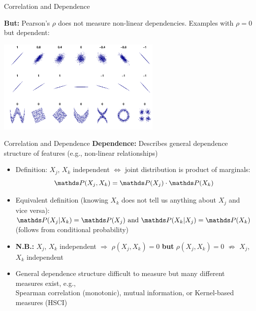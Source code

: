 \documentclass[11pt,compress,t,notes=noshow, aspectratio=169, xcolor=table]{beamer}
\begin{document}
\begin{frame}{Correlation and Dependence}

\textbf{But:} Pearson's $\rho$ does not measure non-linear dependencies. Examples with $\rho = 0$ but dependent:

\centering
\includegraphics[width = 0.6\textwidth, trim=0 0 0 190px, clip]{figure/dependence_2}
\end{frame}



\begin{frame}{Correlation and Dependence}
\textbf{Dependence:} Describes general dependence structure of features (e.g., non-linear relationships)

\begin{itemize}
\item Definition: $X_j$, $X_k$ independent $\Leftrightarrow$ joint distribution is product of marginals:
$$\P(X_j, X_k) = \P(X_j) \cdot \P(X_k)$$
\item Equivalent definition (knowing $X_k$ does not tell us anything about $X_j$ and vice versa): \\
\medskip
\phantom{AAA} $\P(X_j|X_k) = \P(X_j) \text{ and } \P(X_k|X_j) = \P(X_k)$ \hfill (follows from conditional probability) \phantom{AAA}
\medskip
\item \textbf{N.B.:} $X_j$, $X_k$ independent $\Rightarrow$ $\rho(X_j, X_k) = 0$ \textbf{but} $\rho(X_j, X_k) = 0$ $\nRightarrow$ $X_j$, $X_k$  independent
\item General dependence structure difficult to measure but many different measures exist, e.g., \\
Spearman correlation (monotonic), mutual information, or Kernel-based measures (HSCI)
\end{itemize}

\centering


\end{frame}
\end{document}
